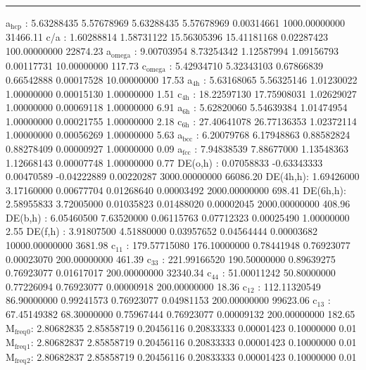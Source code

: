 \documentclass[11pt]{article}
\begin{document}
\noindent\rule{\textwidth}{0.5pt}
a\(_{\text{hcp}}\)   :   5.63288435   5.57678969   5.63288435   5.57678969   0.00314661 1000.00000000     31466.11
c/a     :   1.60288814   1.58731122  15.56305396  15.41181168   0.02287423 100.00000000     22874.23
a\(_{\text{omega}}\) :   9.00703954   8.73254342   1.12587994   1.09156793   0.00117731  10.00000000       117.73
c\(_{\text{omega}}\) :   5.42934710   5.32343103   0.67866839   0.66542888   0.00017528  10.00000000        17.53
a\(_{\text{4h}}\)    :   5.63168065   5.56325146   1.01230022   1.00000000   0.00015130   1.00000000         1.51
c\(_{\text{4h}}\)    :  18.22597130  17.75908031   1.02629027   1.00000000   0.00069118   1.00000000         6.91
a\(_{\text{6h}}\)    :   5.62820060   5.54639384   1.01474954   1.00000000   0.00021755   1.00000000         2.18
c\(_{\text{6h}}\)    :  27.40641078  26.77136353   1.02372114   1.00000000   0.00056269   1.00000000         5.63
a\(_{\text{bcc}}\)   :   6.20079768   6.17948863   0.88582824   0.88278409   0.00000927   1.00000000         0.09
a\(_{\text{fcc}}\)   :   7.94838539   7.88677000   1.13548363   1.12668143   0.00007748   1.00000000         0.77
DE(o,h) :   0.07058833  -0.63343333   0.00470589  -0.04222889   0.00220287 3000.00000000     66086.20
DE(4h,h):   1.69426000   3.17160000   0.00677704   0.01268640   0.00003492 2000.00000000       698.41
DE(6h,h):   2.58955833   3.72005000   0.01035823   0.01488020   0.00002045 2000.00000000       408.96
DE(b,h) :   6.05460500   7.63520000   0.06115763   0.07712323   0.00025490   1.00000000         2.55
DE(f,h) :   3.91807500   4.51880000   0.03957652   0.04564444   0.00003682 10000.00000000      3681.98
c\(_{\text{11}}\)    : 179.57715080 176.10000000   0.78441948   0.76923077   0.00023070 200.00000000       461.39
c\(_{\text{33}}\)    : 221.99166520 190.50000000   0.89639275   0.76923077   0.01617017 200.00000000     32340.34
c\(_{\text{44}}\)    :  51.00011242  50.80000000   0.77226094   0.76923077   0.00000918 200.00000000        18.36
c\(_{\text{12}}\)    : 112.11320549  86.90000000   0.99241573   0.76923077   0.04981153 200.00000000     99623.06
c\(_{\text{13}}\)    :  67.45149382  68.30000000   0.75967444   0.76923077   0.00009132 200.00000000       182.65
M\(_{\text{freq}}\)\(_{\text{0}}\):   2.80682835   2.85858719   0.20456116   0.20833333   0.00001423   0.10000000         0.01
M\(_{\text{freq}}\)\(_{\text{1}}\):   2.80682837   2.85858719   0.20456116   0.20833333   0.00001423   0.10000000         0.01
M\(_{\text{freq}}\)\(_{\text{2}}\):   2.80682837   2.85858719   0.20456116   0.20833333   0.00001423   0.10000000         0.01
\end{document}
